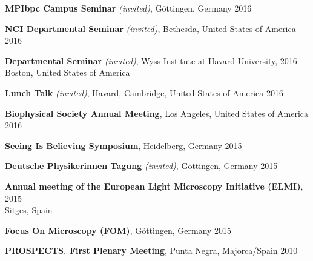 \documentclass[margin,line]{res}
\begin{document}
\begin{resume}
\vspace*{-2.5mm}
{\bf MPIbpc Campus Seminar} {\it (invited)}, Göttingen, Germany \hfill 2016%

\vspace*{-2.5mm}
{\bf NCI Departmental Seminar} {\it (invited)}, Bethesda, United States of America \hfill 2016%

\vspace*{-2.5mm}
{\bf Departmental Seminar} {\it (invited)}, Wyss Institute at Havard University,  \hfill 2016\\
Boston, United States of America

\vspace*{-2.5mm}
{\bf Lunch Talk} {\it (invited)}, Havard, Cambridge, United States of America \hfill 2016%

\vspace*{-2.5mm}
{\bf Biophysical Society Annual Meeting}, Los Angeles, United States of America \hfill 2016%

\vspace*{-2.5mm}
{\bf Seeing Is Believing Symposium}, Heidelberg, Germany \hfill 2015%

\vspace*{-2.5mm}
{\bf Deutsche Physikerinnen Tagung} {\it (invited)}, Göttingen, Germany \hfill 2015%

\vspace*{-2.5mm}
{\bf Annual meeting of the European Light Microscopy Initiative (ELMI)},  \hfill 2015\\Sitges, Spain%

\vspace*{-2.5mm}
{\bf Focus On Microscopy (FOM)}, Göttingen, Germany  \hfill 2015%

\vspace*{-2.5mm}
{\bf PROSPECTS. First Plenary Meeting}, Punta Negra, Majorca/Spain  \hfill 2010 %


\end{resume}
\end{document}
